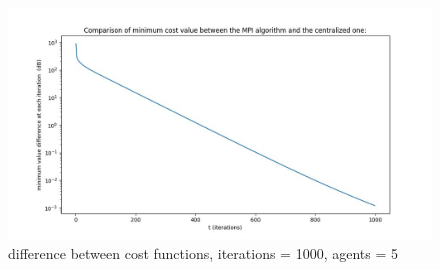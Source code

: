 \documentclass[a4paper,11pt,oneside]{book}
\begin{document}
{{\begin{figure}[H]
\end{figure}

\begin{figure}[H]
 \centering
 \includegraphics[width=14.5 cm]{figure6.jpg}
 \caption{difference between cost functions,  iterations = 1000, agents = 5}
 
\end{figure}



}}
\end{document}

